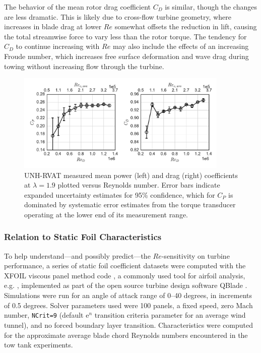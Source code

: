 \documentclass[energies,article,accept,moreauthors,pdftex,12pt,a4paper]{mdpi}
\begin{document}
The behavior of the mean rotor drag coefficient $C_D$ is similar, though the
changes are less dramatic. This is likely due to cross-flow turbine geometry,
where increases in blade drag at lower $Re$ somewhat offsets the reduction in
lift, causing the total streamwise force to vary less than the rotor torque. The
tendency for $C_D$ to continue increasing with $Re$ may also include the effects
of an increasing Froude number, which increases free surface deformation and
wave drag during towing without increasing flow through the turbine.

\begin{figure}[ht]
\centering

\includegraphics[width=0.9\textwidth]{figures/perf_re_dep}

\caption{UNH-RVAT measured mean power (left) and drag (right) coefficients at
    $\lambda=1.9$ plotted versus Reynolds number. Error bars indicate expanded
    uncertainty estimates for 95\% confidence, which for $C_P$ is dominated by
    systematic error estimates from the torque transducer operating at the lower end
    of its measurement range.}

\label{fig:perf-Re-dep}
\end{figure}


\subsubsection{Relation to Static Foil Characteristics}

To help understand---and possibly predict---the $Re$-sensitivity on turbine
performance, a series of static foil coefficient datasets were computed with the
XFOIL viscous panel method code \cite{Drela1989}, a commonly used tool for
airfoil analysis, e.g. \cite{Castelli2011, Walker2014}, implemented as part of
the open source turbine design software QBlade \cite{Marten2013}. Simulations
were run for an angle of attack range of 0--40 degrees, in increments of 0.5
degrees. Solver parameters used were 100 panels, a fixed speed, zero Mach
number, \texttt{NCrit=9} (default $\mathrm{e}^n$ transition criteria parameter
for an average wind tunnel), and no forced boundary layer transition.
Characteristics were computed for the approximate average blade chord Reynolds
numbers encountered in the tow tank experiments.
\end{document}
